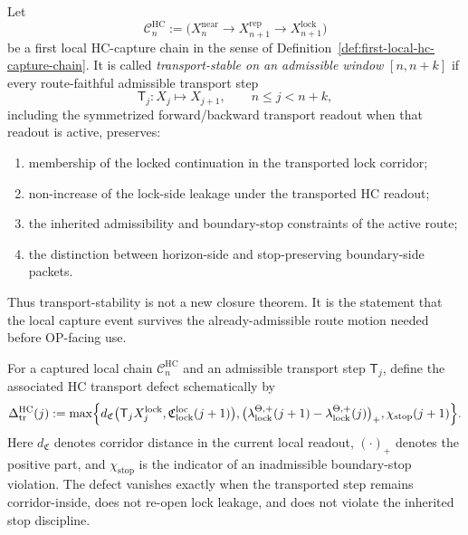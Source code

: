 \begin{definition}
\label{def:transport-stable-hc-capture-chain}
Let
\[
  \mathcal C_{n}^{\mathrm{HC}}
  :=
  \bigl(
    X_n^{\mathrm{near}}
    \to
    X_{n+1}^{\mathrm{rep}}
    \to
    X_{n+1}^{\mathrm{lock}}
  \bigr)
\]
be a first local HC-capture chain in the sense of Definition~\ref{def:first-local-hc-capture-chain}.  It is called
\emph{transport-stable on an admissible window} $[n,n+k]$ if every route-faithful admissible transport step
\[
  \mathsf T_j:X_j\longmapsto X_{j+1},
  \qquad n\leq j<n+k,
\]
including the symmetrized forward/backward transport readout when that readout is active, preserves:
\begin{enumerate}[leftmargin=2em,label=(\alph*)]
  \item membership of the locked continuation in the transported lock corridor;
  \item non-increase of the lock-side leakage under the transported HC readout;
  \item the inherited admissibility and boundary-stop constraints of the active route;
  \item the distinction between horizon-side and stop-preserving boundary-side packets.
\end{enumerate}
Thus transport-stability is not a new closure theorem.  It is the statement that the local capture event survives the already-admissible route motion needed before OP-facing use.
\end{definition}

\begin{definition}
\label{def:hc-transport-defect}
For a captured local chain $\mathcal C_n^{\mathrm{HC}}$ and an admissible transport step $\mathsf T_j$, define the associated HC transport defect schematically by
\[
  \Delta_{\mathrm{tr}}^{\mathrm{HC}}(j)
  :=
  \max\Bigl\{
    d_{\mathfrak C}\bigl(\mathsf T_j X_{j}^{\mathrm{lock}},\mathfrak C_{\mathrm{lock}}^{\mathrm{loc}}(j+1)\bigr),
    \bigl(\lambda_{\mathrm{lock}}^{\Theta,+}(j+1)-\lambda_{\mathrm{lock}}^{\Theta,+}(j)\bigr)_{+},
    \chi_{\mathrm{stop}}(j+1)
  \Bigr\}.
\]
Here $d_{\mathfrak C}$ denotes corridor distance in the current local readout, $(\cdot)_+$ denotes the positive part, and $\chi_{\mathrm{stop}}$ is the indicator of an inadmissible boundary-stop violation.  The defect vanishes exactly when the transported step remains corridor-inside, does not re-open lock leakage, and does not violate the inherited stop discipline.
\end{definition}

